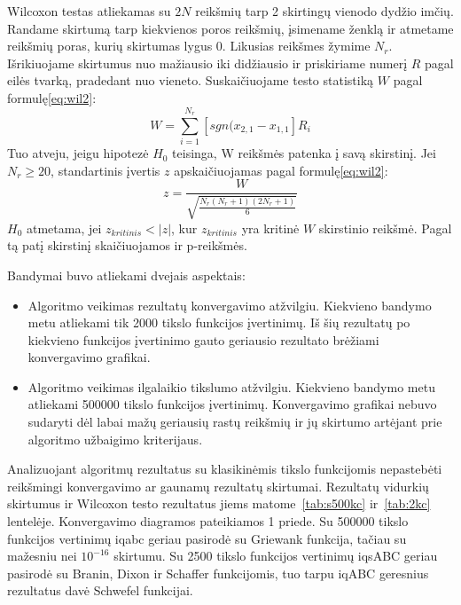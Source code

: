 \documentclass{VUMIFPSmagistrinis}
\begin{document}

Wilcoxon testas atliekamas su $2N$ reikšmių tarp 2 skirtingų vienodo dydžio imčių. Randame skirtumą tarp kiekvienos poros reikšmių, įsimename ženklą ir atmetame reikšmių poras, kurių skirtumas lygus 0. Likusias reikšmes žymime $N_{r}$. Išrikiuojame skirtumus nuo mažiausio iki didžiausio ir priskiriame numerį $R$ pagal eilės tvarką, pradedant nuo vieneto. Suskaičiuojame testo statistiką $W$ pagal formulę\eqref{eq:wil2}:
\begin{equation}\label{eq:wil1}
    W = \sum^{N_{r}}_{i=1} [sgn(x_{2,1}-x_{1,1}] R_{i}
\end{equation}
Tuo atveju, jeigu hipotezė $H_{0}$ teisinga, W reikšmės patenka į savą skirstinį. Jei $N_{r} \geq 20$,  standartinis įvertis $z$ apskaičiuojamas pagal formulę\eqref{eq:wil2}:
\begin{equation}\label{eq:wil2}
    z = \frac{W}{\sqrt{\frac{N_{r}(N_{r}+1)(2N_{r}+1)}{6}}}
\end{equation}
$H_{0}$ atmetama, jei $z_{kritinis} < |z|$, kur  $z_{kritinis}$ yra kritinė $W$ skirstinio reikšmė. Pagal tą patį skirstinį skaičiuojamos ir p-reikšmės.



Bandymai buvo atliekami dvejais aspektais:
\begin{itemize}
    \item Algoritmo veikimas rezultatų konvergavimo atžvilgiu. Kiekvieno bandymo metu atliekami tik 2000 tikslo funkcijos įvertinimų. Iš šių rezultatų po kiekvieno funkcijos įvertinimo gauto geriausio rezultato brėžiami konvergavimo grafikai.
    \item Algoritmo veikimas ilgalaikio tikslumo atžvilgiu. Kiekvieno bandymo metu atliekami 500000 tikslo funkcijos įvertinimų. Konvergavimo grafikai nebuvo sudaryti dėl labai mažų geriausių rastų reikšmių ir jų skirtumo artėjant prie algoritmo užbaigimo kriterijaus.
\end{itemize}

Analizuojant algoritmų rezultatus su klasikinėmis tikslo funkcijomis nepastebėti reikšmingi konvergavimo ar gaunamų rezultatų skirtumai. Rezultatų vidurkių skirtumus ir Wilcoxon testo rezultatus jiems matome~\ref{tab:s500kc} ir~\ref{tab:2kc} lentelėje. Konvergavimo diagramos pateikiamos 1 priede. Su 500000 tikslo funkcijos vertinimų iqabc geriau pasirodė su Griewank funkcija, tačiau su mažesniu nei $10^{-16}$ skirtumu. Su 2500 tikslo funkcijos vertinimų iqsABC geriau pasirodė su Branin, Dixon ir Schaffer funkcijomis, tuo tarpu iqABC geresnius rezultatus davė Schwefel funkcijai.
\end{document}
